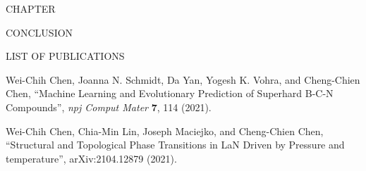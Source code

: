 \lipsum[2-4]
\pagebreak




    

	

    \addtocounter{numch}{1}
	
	{\centering
		\vspace{0pt} \hspace{0pt} \par
	}
	{\centering
		\vspace{56pt} CHAPTER  \the\value{numch}
	}
	{\centering\singlespacing
		CONCLUSION
	    \par
	}
	{\centering
		\vspace{0pt} \hspace{0pt} \par
	}
	

	
\lipsum[2-4]
\pagebreak
	

	
	{\centering
		\vspace{0pt} \hspace{0pt} \par
	}
	{\centering
		\vspace{56pt} LIST OF PUBLICATIONS
	}
	{\centering\singlespacing
		
	    \par
	}
	{\centering
		\vspace{0pt} \hspace{0pt} \par
	}
	\noindent Wei-Chih Chen, Joanna N. Schmidt, Da Yan, Yogesh K. Vohra, and Cheng-Chien Chen, “Machine Learning and Evolutionary Prediction of Superhard B-C-N Compounds”, {\it npj Comput Mater} {\bf 7}, 114 (2021).
	
	\vspace{12pt}

    \noindent Wei-Chih Chen, Chia-Min Lin, Joseph Maciejko, and Cheng-Chien Chen, “Structural and Topological Phase Transitions in LaN Driven by Pressure and temperature”, arXiv:2104.12879 (2021).

